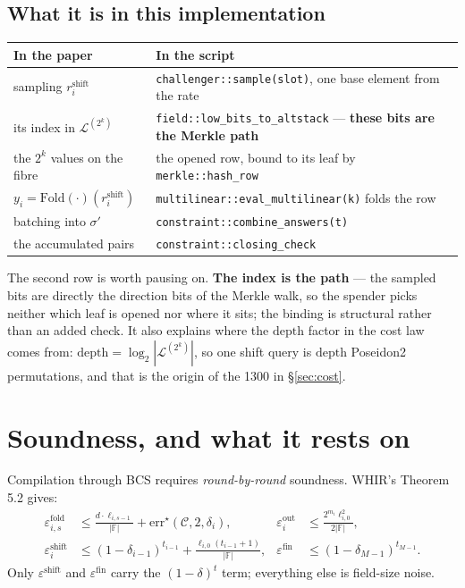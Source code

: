 \documentclass[11pt,a4paper]{article}
\newcommand{\Fold}{\mathrm{Fold}}
\newcommand{\err}{\mathrm{err}}
\begin{document}
\subsection*{What it is in this implementation}

\begin{center}\small
\begin{tabular}{@{}p{5.2cm}p{8.4cm}@{}}
\toprule
\textbf{In the paper} & \textbf{In the script}\\
\midrule
sampling $r^{\mathrm{shift}}_{i}$ & \texttt{challenger::sample(slot)}, one base element from the rate\\
its index in $\mathcal{L}^{(2^{k})}$ & \texttt{field::low\_bits\_to\_altstack} --- \textbf{these bits are the Merkle path}\\
the $2^{k}$ values on the fibre & the opened row, bound to its leaf by \texttt{merkle::hash\_row}\\
$y_{i}=\Fold(\cdot)(r^{\mathrm{shift}}_{i})$ & \texttt{multilinear::eval\_multilinear(k)} folds the row\\
batching into $\sigma'$ & \texttt{constraint::combine\_answers(t)}\\
the accumulated pairs & \texttt{constraint::closing\_check}\\
\bottomrule
\end{tabular}
\end{center}

The second row is worth pausing on. \textbf{The index is the path} --- the sampled bits are directly
the direction bits of the Merkle walk, so the spender picks neither which leaf is opened nor where
it sits; the binding is structural rather than an added check. It also explains where the
$\mathrm{depth}$ factor in the cost law comes from:
$\mathrm{depth}=\log_{2}|\mathcal{L}^{(2^{k})}|$, so one shift query is $\mathrm{depth}$ Poseidon2
permutations, and that is the origin of the 1300 in \S\ref{sec:cost}.

\section{Soundness, and what it rests on}\label{sec:eps}

Compilation through BCS requires \emph{round-by-round} soundness. WHIR's Theorem 5.2 gives:
\begin{align*}
  \varepsilon^{\mathrm{fold}}_{i,s} &\le \frac{d\cdot\ell_{i,s-1}}{|\mathbb{F}|}
    + \err^{\star}(\mathcal{C},2,\delta_{i}),
  &\varepsilon^{\mathrm{out}}_{i} &\le \frac{2^{m_{i}}\ell^{2}_{i,0}}{2|\mathbb{F}|},\\
  \varepsilon^{\mathrm{shift}}_{i} &\le (1-\delta_{i-1})^{t_{i-1}}
    + \frac{\ell_{i,0}(t_{i-1}+1)}{|\mathbb{F}|},
  &\varepsilon^{\mathrm{fin}} &\le (1-\delta_{M-1})^{t_{M-1}}.
\end{align*}
Only $\varepsilon^{\mathrm{shift}}$ and $\varepsilon^{\mathrm{fin}}$ carry the $(1-\delta)^{t}$
term; everything else is field-size noise.
\end{document}
